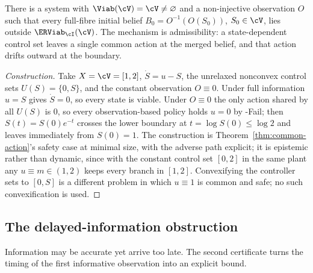 \begin{proposition}\label{prop:emptiness}
There is a system with $\Viab(\cV)=\cV\ne\varnothing$ and a non-injective observation $O$ such that every full-fibre initial belief $B_0=O^{-1}(O(S_0))$, $S_0\in\cV$, lies outside $\ERViab_\cI(\cV)$. The mechanism is admissibility: a state-dependent control set leaves a single common action at the merged belief, and that action drifts outward at the boundary.
\end{proposition}

\begin{proof}[Construction]
Take $X=\cV=[1,2]$, $\dot S=u-S$, the unrelaxed nonconvex control sets $U(S)=\{0,S\}$, and the constant observation $O\equiv0$. Under full information $u=S$ gives $\dot S=0$, so every state is viable. Under $O\equiv0$ the only action shared by all $U(S)$ is $0$, so every observation-based policy holds $u=0$ by \hyp{Fail}; then $S(t)=S(0)e^{-t}$ crosses the lower boundary at $t=\log S(0)\le\log2$ and leaves immediately from $S(0)=1$. The construction is Theorem~\ref{thm:common-action}'s safety case at minimal size, with the adverse path explicit; it is epistemic rather than dynamic, since with the constant control set $[0,2]$ in the same plant any $u\equiv m\in(1,2)$ keeps every branch in $[1,2]$. Convexifying the controller sets to $[0,S]$ is a different problem in which $u\equiv1$ is common and safe; no such convexification is used.
\end{proof}

\subsection{The delayed-information obstruction}\label{sec:delayed}

Information may be accurate yet arrive too late. The second certificate turns the timing of the first informative observation into an explicit bound.

